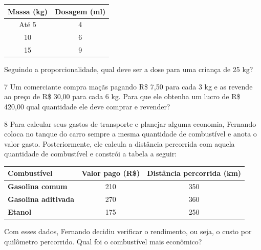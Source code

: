 \begin{center}
\begin{tabular}{|c|c|}
\hline
\textbf{Massa (kg)} & \textbf{Dosagem (ml)} \\ \hline
Até 5 & 4 \\ \hline
10 & 6 \\ \hline
15 & 9 \\ \hline
\end{tabular}
\end{center}

Seguindo a proporcionalidade, qual deve ser a dose para uma criança de 25
kg?

\begin{emptybox}
\end{emptybox}

\num{7} Um comerciante compra maçãs pagando R\$ 7,50 para cada 3 kg e as
revende ao preço de R\$ 30,00 para cada 6 kg. Para que ele obtenha um
lucro de R\$ 420,00 qual quantidade ele deve comprar e revender?

\begin{emptybox}
\end{emptybox}

\num{8} Para calcular seus gastos de transporte e planejar alguma economia,
Fernando coloca no tanque do carro sempre a mesma quantidade de combustível 
e anota o valor gasto. Posteriormente, ele calcula a distância percorrida com
aquela quantidade de combustível e constrói a tabela a seguir:

\begin{tabular}{|l |c|c|}
\hline
\textbf{Combustível} & \textbf{Valor pago (R\$)} & \textbf{Distância percorrida (km)} \\ \hline
\textbf{Gasolina comum} & 210 & 350 \\ \hline
\textbf{Gasolina aditivada} & 270 & 360 \\ \hline
\textbf{Etanol} & 175 & 250 \\ \hline
\end{tabular}

Com esses dados, Fernando decidiu verificar o rendimento, ou seja, o custo 
por quilômetro percorrido. Qual foi o combustível mais econômico?

